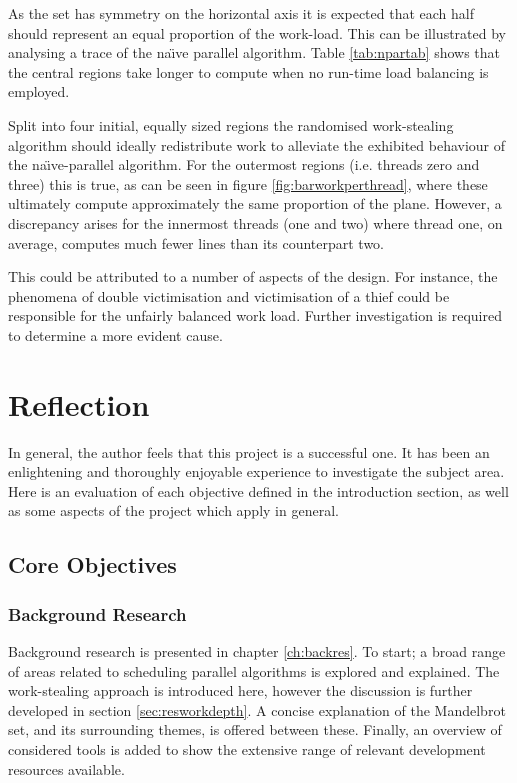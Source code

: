 \begin{itemize}
    As the set has symmetry on the horizontal axis it is expected that each half should represent an equal 
    proportion of the work-load. 
    This can be illustrated by analysing a trace of the na\"{\i}ve parallel algorithm. Table \ref{tab:npartab} shows that the 
    central regions take longer to compute when no run-time load balancing is employed.
    
    Split into four initial, equally sized regions the randomised work-stealing algorithm should ideally redistribute work 
    to alleviate the exhibited behaviour of the na\"{\i}ve-parallel algorithm.
    For the outermost regions (i.e. threads zero and three) this is true, as can be seen in figure \ref{fig:barworkperthread},
    where these ultimately compute approximately the same proportion of the plane.
    However, a discrepancy arises for the innermost threads (one and two) where thread one, on average, computes much fewer lines
    than its counterpart two. 

    This could be attributed to a number of aspects of the design. For instance, the phenomena of double victimisation and 
    victimisation of a thief could be responsible for the unfairly balanced work load. Further investigation is
    required to determine a more evident cause.
        
\end{itemize}

\section{Reflection}

In general, the author feels that this project is a successful one. It has been an enlightening and thoroughly enjoyable experience
to investigate the subject area. Here is an evaluation of each objective defined in the introduction section, as well as some aspects 
of the project which apply in general.

\subsection*{Core Objectives}
\subsubsection*{Background Research}
    Background research is presented in chapter \ref{ch:backres}. To start; a broad range of areas related to scheduling parallel algorithms is explored 
    and explained. The work-stealing approach is introduced here, however the discussion is further developed in section \ref{sec:resworkdepth}. 
    A concise explanation of the Mandelbrot set, and its surrounding themes, is offered between these. 
    Finally, an overview of considered tools is added to show the extensive range of relevant development resources available.
    

